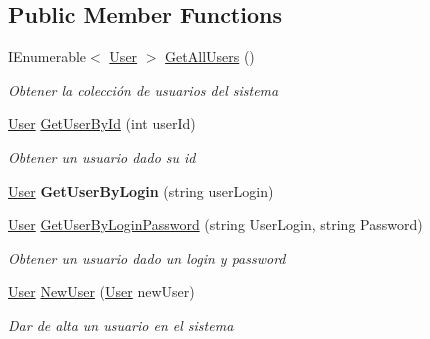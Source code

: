 \subsection*{Public Member Functions}
\begin{DoxyCompactItemize}
\item 
I\+Enumerable$<$ \mbox{\hyperlink{class_h_k_supply_1_1_models_1_1_user}{User}} $>$ \mbox{\hyperlink{class_h_k_supply_1_1_services_1_1_implementations_1_1_e_f_user_a145638eeeb9e29780d17cbac23476a8d}{Get\+All\+Users}} ()
\begin{DoxyCompactList}\small\item\em Obtener la colección de usuarios del sistema \end{DoxyCompactList}\item 
\mbox{\hyperlink{class_h_k_supply_1_1_models_1_1_user}{User}} \mbox{\hyperlink{class_h_k_supply_1_1_services_1_1_implementations_1_1_e_f_user_a322969baaacbf15223b17f8117dd1545}{Get\+User\+By\+Id}} (int user\+Id)
\begin{DoxyCompactList}\small\item\em Obtener un usuario dado su id \end{DoxyCompactList}\item 
\mbox{\label{class_h_k_supply_1_1_services_1_1_implementations_1_1_e_f_user_a330c2846df2d0fc7f7baa70889ebb3ed}} 
\mbox{\hyperlink{class_h_k_supply_1_1_models_1_1_user}{User}} {\bfseries Get\+User\+By\+Login} (string user\+Login)
\item 
\mbox{\hyperlink{class_h_k_supply_1_1_models_1_1_user}{User}} \mbox{\hyperlink{class_h_k_supply_1_1_services_1_1_implementations_1_1_e_f_user_a69f04e0ab5ba947fc315c60abc7cdbf1}{Get\+User\+By\+Login\+Password}} (string User\+Login, string Password)
\begin{DoxyCompactList}\small\item\em Obtener un usuario dado un login y password \end{DoxyCompactList}\item 
\mbox{\hyperlink{class_h_k_supply_1_1_models_1_1_user}{User}} \mbox{\hyperlink{class_h_k_supply_1_1_services_1_1_implementations_1_1_e_f_user_a12abd287dc0491eed772d88b17fc9618}{New\+User}} (\mbox{\hyperlink{class_h_k_supply_1_1_models_1_1_user}{User}} new\+User)
\begin{DoxyCompactList}\small\item\em Dar de alta un usuario en el sistema \end{DoxyCompactList}\item 

\end{DoxyCompactItemize}
